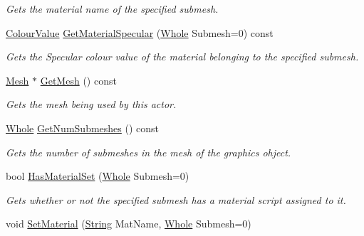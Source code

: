 \begin{DoxyCompactItemize}
\begin{DoxyCompactList}\small\item\em Gets the material name of the specified submesh. \item\end{DoxyCompactList}\item 
\hyperlink{classphys_1_1ColourValue}{ColourValue} \hyperlink{classphys_1_1ActorGraphicsSettings_a2598d7db0dd899417aa3e4d017b8c6ab}{GetMaterialSpecular} (\hyperlink{namespacephys_a460f6bc24c8dd347b05e0366ae34f34a}{Whole} Submesh=0) const 
\begin{DoxyCompactList}\small\item\em Gets the Specular colour value of the material belonging to the specified submesh. \item\end{DoxyCompactList}\item 
\hyperlink{classphys_1_1Mesh}{Mesh} $\ast$ \hyperlink{classphys_1_1ActorGraphicsSettings_a0da0604290e4c0f351cc8df0f0d99633}{GetMesh} () const 
\begin{DoxyCompactList}\small\item\em Gets the mesh being used by this actor. \item\end{DoxyCompactList}\item 
\hyperlink{namespacephys_a460f6bc24c8dd347b05e0366ae34f34a}{Whole} \hyperlink{classphys_1_1ActorGraphicsSettings_a550bd94bc063ce629e4c9aa511dbfb79}{GetNumSubmeshes} () const 
\begin{DoxyCompactList}\small\item\em Gets the number of submeshes in the mesh of the graphics ohject. \item\end{DoxyCompactList}\item 
bool \hyperlink{classphys_1_1ActorGraphicsSettings_a7b1948300461014e30e8a295917ae886}{HasMaterialSet} (\hyperlink{namespacephys_a460f6bc24c8dd347b05e0366ae34f34a}{Whole} Submesh=0)
\begin{DoxyCompactList}\small\item\em Gets whether or not the specified submesh has a material script assigned to it. \item\end{DoxyCompactList}\item 
void \hyperlink{classphys_1_1ActorGraphicsSettings_a8954153fe516ddf4e0107348c3af5abc}{SetMaterial} (\hyperlink{namespacephys_aa03900411993de7fbfec4789bc1d392e}{String} MatName, \hyperlink{namespacephys_a460f6bc24c8dd347b05e0366ae34f34a}{Whole} Submesh=0)

\end{DoxyCompactItemize}
